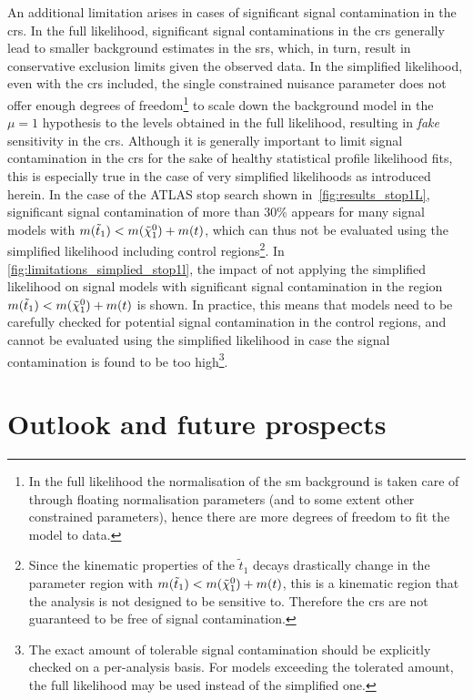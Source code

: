 An additional limitation arises in cases of significant signal contamination in the \glspl{cr}. In the full likelihood, significant signal contaminations in the \glspl{cr} generally lead to smaller background estimates in the \glspl{sr}, which, in turn, result in conservative exclusion limits given the observed data.
In the simplified likelihood, even with the \glspl{cr} included, the single constrained nuisance parameter does not offer enough degrees of freedom\footnote{In the full likelihood the normalisation of the \gls{sm} background is taken care of through floating normalisation parameters (and to some extent other constrained parameters), hence there are more degrees of freedom to fit the model to data.} to scale down the background model in the $\mu = 1$ hypothesis to the levels obtained in the full likelihood, resulting in \textit{fake} sensitivity in the \glspl{cr}.
Although it is generally important to limit signal contamination in the \glspl{cr} for the sake of healthy statistical profile likelihood fits, this is especially true in the case of very simplified likelihoods as introduced herein.
In the case of the ATLAS stop search shown in~\cref{fig:results_stop1L}, significant signal contamination of more than 30\% appears for many signal models with $m(\tilde{t}_1) < m(\tilde{\chi}_1^0)+m(t)$, which can thus not be evaluated using the simplified likelihood including control regions\footnote{Since the kinematic properties of the $\tilde{t}_1$ decays drastically change in the parameter region with $m(\tilde{t}_1) < m(\tilde{\chi}_1^0)+m(t)$, this is a kinematic region that the analysis is not designed to be sensitive to. Therefore the \glspl{cr} are not guaranteed to be free of signal contamination.}.
In \cref{fig:limitations_simplied_stop1l}, the impact of not applying the simplified likelihood on signal models with significant signal contamination in the region $m(\tilde{t}_1) < m(\tilde{\chi}_1^0)+m(t)$ is shown. In practice, this means that models need to be carefully checked for potential signal contamination in the control regions, and cannot be evaluated using the simplified likelihood in case the signal contamination is found to be too high\footnote{The exact amount of tolerable signal contamination should be explicitly checked on a per-analysis basis. For models exceeding the tolerated amount, the full likelihood may be used instead of the simplified one.}.

\section{Outlook and future prospects}\label{sec:simplify_outlook}


